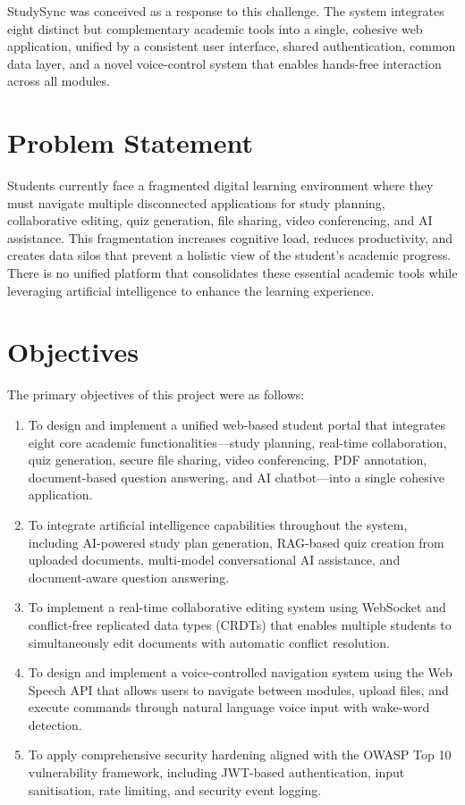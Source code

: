 \documentclass[12pt,a4paper]{report}
\begin{document}
StudySync was conceived as a response to this challenge. The system integrates eight distinct but complementary academic tools into a single, cohesive web application, unified by a consistent user interface, shared authentication, common data layer, and a novel voice-control system that enables hands-free interaction across all modules.

\section{Problem Statement}

Students currently face a fragmented digital learning environment where they must navigate multiple disconnected applications for study planning, collaborative editing, quiz generation, file sharing, video conferencing, and AI assistance. This fragmentation increases cognitive load, reduces productivity, and creates data silos that prevent a holistic view of the student's academic progress. There is no unified platform that consolidates these essential academic tools while leveraging artificial intelligence to enhance the learning experience.

\section{Objectives}

The primary objectives of this project were as follows:

\begin{enumerate}
    \item To design and implement a unified web-based student portal that integrates eight core academic functionalities---study planning, real-time collaboration, quiz generation, secure file sharing, video conferencing, PDF annotation, document-based question answering, and AI chatbot---into a single cohesive application.

    \item To integrate artificial intelligence capabilities throughout the system, including AI-powered study plan generation, RAG-based quiz creation from uploaded documents, multi-model conversational AI assistance, and document-aware question answering.

    \item To implement a real-time collaborative editing system using WebSocket and conflict-free replicated data types (CRDTs) that enables multiple students to simultaneously edit documents with automatic conflict resolution.

    \item To design and implement a voice-controlled navigation system using the Web Speech API that allows users to navigate between modules, upload files, and execute commands through natural language voice input with wake-word detection.

    \item To apply comprehensive security hardening aligned with the OWASP Top 10 vulnerability framework, including JWT-based authentication, input sanitisation, rate limiting, and security event logging.
\end{enumerate}
\end{document}

